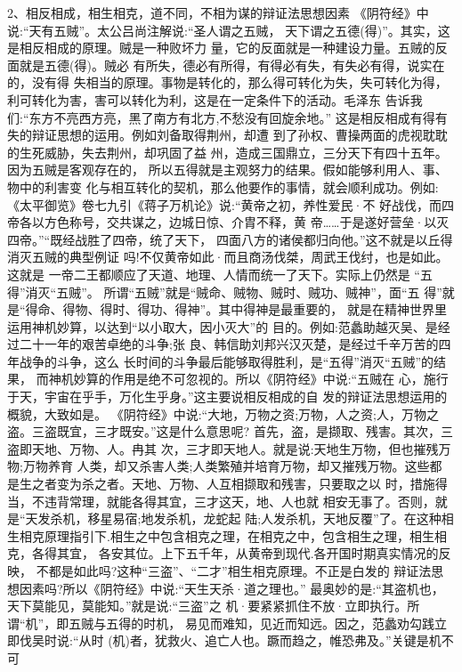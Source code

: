 \documentclass[12pt,UTF8]{ctexbook}
\begin{document}
2、相反相成，相生相克，道不同，不相为谋的辩证法思想因素
《阴符经》中说:“天有五贼”。太公吕尚注解说:“圣人谓之五贼，
天下谓之五德(得)”。其实，这是相反相成的原理。贼是一种败坏力
量，它的反面就是一种建设力量。五贼的反面就是五德(得)。贼必
有所失，德必有所得，有得必有失，有失必有得，说实在的，没有得
失相当的原理。事物是转化的，那么得可转化为失，失可转化为得，
利可转化为害，害可以转化为利，这是在一定条件下的活动。毛泽东
告诉我们:“东方不亮西方亮，黑了南方有北方,不愁没有回旋余地。”
这是相反相成有得有失的辩证思想的运用。例如刘备取得荆州，却遭
到了孙权、曹操两面的虎视耽耽的生死威胁，失去荆州，却巩固了益
州，造成三国鼎立，三分天下有四十五年。因为五贼是客观存在的，
所以五得就是主观努力的结果。假如能够利用人、事、物中的利害变
化与相互转化的契机，那么他要作的事情，就会顺利成功。例如:《太平御览》卷七九引《蒋子万机论》说:“黄帝之初，养性爱民·不
好战伐，而四帝各以方色称号，交共谋之，边城日惊、介胄不释，黄
帝……于是遂好营垒·以灭四帝。”“既经战胜了四帝，统了天下，
四面八方的诸侯都归向他。”这不就是以丘得消灭五贼的典型例证
吗!不仅黄帝如此·而且商汤伐桀，周武王伐纣，也是如此。这就是
一帝二王都顺应了天道、地理、人情而统一了天下。实际上仍然是
“五得”消灭“五贼”。
所谓“五贼”就是“贼命、贼物、贼时、贼功、贼神”，面“五
得”就是“得命、得物、得时、得功、得神”。其中得神是最重要的，
就是在精神世界里运用神机妙算，以达到“以小取大，因小灭大”的
目的。例如:范蠡助越灭吴、是经过二十一年的艰苦卓绝的斗争;张
良、韩信助刘邦兴汉灭楚，是经过千辛万苦的四年战争的斗争，这么
长时间的斗争最后能够取得胜利，是“五得”消灭“五贼”的结果，
而神机妙算的作用是绝不可忽视的。所以《阴符经》中说:“五贼在
心，施行于天，宇宙在乎手，万化生乎身。”这主要说相反相成的自
发的辩证法思想运用的概貌，大致如是。
《阴符经》中说:“大地，万物之资;万物，人之资;人，万物之
盗。三盗既宜，三才既安。”这是什么意思呢?
首先，盗，是撷取、残害。其次，三盗即天地、万物、人。冉其
次，三才即天地人。就是说:天地生万物，但也摧残万物;万物养育
人类，却又杀害人类;人类繁殖并培育万物，却又摧残万物。这些都
是生之者变为杀之者。天地、万物、人互相撷取和残害，只要取之以
时，措施得当，不违背常理，就能各得其宜，三才这天，地、人也就
相安无事了。否则，就是“天发杀机，移星易宿;地发杀机，龙蛇起
陆;人发杀机，天地反覆”了。在这种相生相克原理指引下.相生之中包含相克之理，在相克之中，包含相生之理，相生相克，各得其宜，
各安其位。上下五千年，从黄帝到现代.各开国时期真实情况的反映，
不都是如此吗?这种“三盗”、“二才”相生相克原理。不正是白发的
辩证法思想因素吗?所以《阴符经》中说:“天生天杀·道之理也。”
最奥妙的是:“其盗机也，天下莫能见，莫能知。”就是说:“三盗”之
机·要紧紧抓住不放·立即执行。所谓“机”，即五贼与五得的时机，
易见而难知，见近而知远。因之，范蠡劝勾践立即伐吴时说:“从时
(机)者，犹救火、追亡人也。蹶而趋之，帷恐弗及。”关键是机不可
\end{document}
